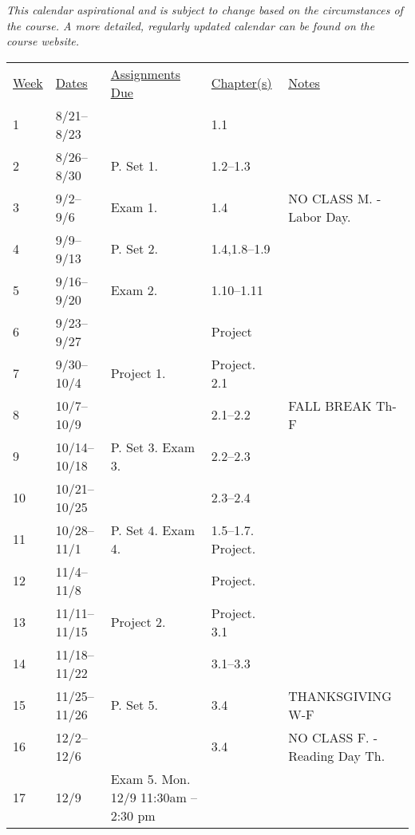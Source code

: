 \documentclass[10pt]{article}
\begin{document}
\textit{This calendar aspirational and is subject to change based on the circumstances of the course. A more detailed, regularly updated calendar can be found on the course website. }


\begin{center}
\begin{tabular}{lllll}
\underline{Week} & \underline{Dates} & \underline{Assignments Due} & \underline{Chapter(s)} & \underline{Notes} \\
1 & 8/21--8/23  &  & 1.1 & \\
2 & 8/26--8/30 & P. Set 1. & 1.2--1.3 & \\
3 & 9/2--9/6 & Exam 1. & 1.4 & NO CLASS M. - Labor Day. \\
4 & 9/9--9/13  & P. Set 2. & 1.4,1.8--1.9 &  \\
5 & 9/16--9/20 & Exam 2. & 1.10--1.11 & \\
6 & 9/23--9/27 &  & Project & \\
7 & 9/30--10/4 & Project 1. & Project. 2.1  & \\
8 & 10/7--10/9 & & 2.1--2.2 & FALL BREAK Th-F  \\
9 & 10/14--10/18 & P. Set 3. Exam 3. & 2.2--2.3 &  \\
10 & 10/21--10/25  & & 2.3--2.4 & \\
11 & 10/28--11/1 & P. Set 4. Exam 4. & 1.5--1.7. Project. & \\
12 & 11/4--11/8 &  & Project. & \\
13 & 11/11--11/15 & Project 2. & Project. 3.1 & \\
14 & 11/18--11/22 &  & 3.1--3.3 & \\
15 & 11/25--11/26 & P. Set 5. & 3.4 & THANKSGIVING W-F \\
16 & 12/2--12/6 & & 3.4 & NO CLASS F. - Reading Day Th.\\
17 & 12/9 & Exam 5. Mon. 12/9 11:30am -- 2:30 pm & &  \\
\end{tabular}
\end{center}
\end{document}
